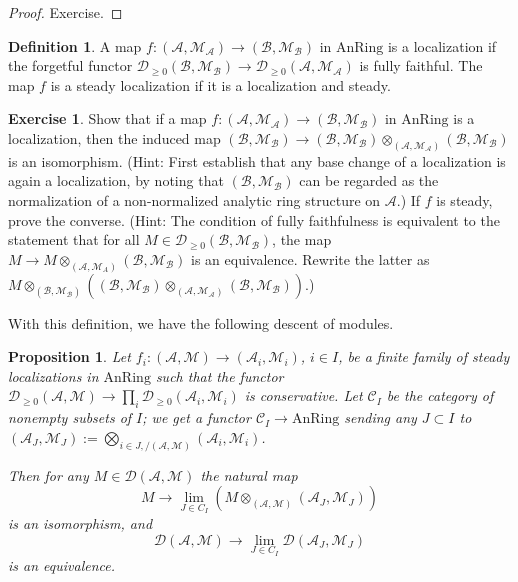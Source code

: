 \documentclass[11pt]{amsbook}
\newcommand{\AnRing}{{\mathrm{AnRing}}}
\numberwithin{equation}{section}
\numberwithin{theorem}{section}
\newtheorem{proposition}[theorem]{Proposition}
\theoremstyle{definition}
\newtheorem{exercise}[theorem]{Exercise}
\newtheorem{definition}[theorem]{Definition}
\begin{document}
\begin{proof} Exercise.
\end{proof}

\begin{definition} A map $f: (\mathcal A,\mathcal M_{\mathcal A})\to (\mathcal B,\mathcal M_{\mathcal B})$ in $\AnRing$ is a localization if the forgetful functor $\mathcal D_{\geq 0}(\mathcal B,\mathcal M_{\mathcal B})\to \mathcal D_{\geq 0}(\mathcal A,\mathcal M_{\mathcal A})$ is fully faithful. The map $f$ is a steady localization if it is a localization and steady.
\end{definition}

\begin{exercise} Show that if a map $f: (\mathcal A,\mathcal M_{\mathcal A})\to (\mathcal B,\mathcal M_{\mathcal B})$ in $\AnRing$ is a localization, then the induced map $(\mathcal B,\mathcal M_{\mathcal B})\to (\mathcal B,\mathcal M_{\mathcal B})\otimes_{(\mathcal A,\mathcal M_{\mathcal A})}(\mathcal B,\mathcal M_{\mathcal B})$ is an isomorphism. (Hint: First establish that any base change of a localization is again a localization, by noting that $(\mathcal B,\mathcal M_{\mathcal B})$ can be regarded as the normalization of a non-normalized analytic ring structure on $\mathcal A$.) If $f$ is steady, prove the converse. (Hint: The condition of fully faithfulness is equivalent to the statement that for all $M\in \mathcal D_{\geq 0}(\mathcal B,\mathcal M_{\mathcal B})$, the map $M\to M\otimes_{(\mathcal A,\mathcal M_A)}(\mathcal B,\mathcal M_{\mathcal B})$ is an equivalence. Rewrite the latter as $M\otimes_{(\mathcal B,\mathcal M_{\mathcal B})} ((\mathcal B,\mathcal M_{\mathcal B})\otimes_{(\mathcal A,\mathcal M_{\mathcal A})}(\mathcal B,\mathcal M_{\mathcal B}))$.)
\end{exercise}

With this definition, we have the following descent of modules.

\begin{proposition}\label{prop:descent} Let $f_i: (\mathcal A,\mathcal M)\to (\mathcal A_i,\mathcal M_i)$, $i\in I$, be a finite family of steady localizations in $\AnRing$ such that the functor $\mathcal D_{\geq 0}(\mathcal A,\mathcal M)\to \prod_i \mathcal D_{\geq 0}(\mathcal A_i,\mathcal M_i)$ is conservative. Let $\mathcal C_I$ be the category of nonempty subsets of $I$; we get a functor $\mathcal C_I\to \AnRing$ sending any $J\subset I$ to $(\mathcal A_J,\mathcal M_J) := \bigotimes_{i\in J,/(\mathcal A,\mathcal M)} (\mathcal A_i,\mathcal M_i)$.

Then for any $M\in \mathcal D(\mathcal A,\mathcal M)$ the natural map
\[
M\to \lim_{J\in C_I} (M\otimes_{(\mathcal A,\mathcal M)} (\mathcal A_J,\mathcal M_J))
\]
is an isomorphism, and
\[
\mathcal D(\mathcal A,\mathcal M)\to \lim_{J\in C_I} \mathcal D(\mathcal A_J,\mathcal M_J)
\]
is an equivalence.
\end{proposition}
\end{document}
